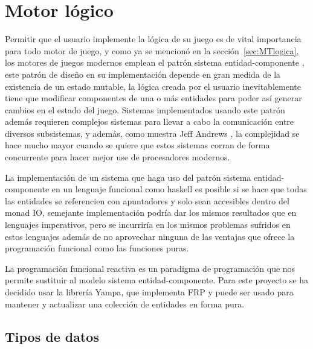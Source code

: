 
\section{Motor lógico}

Permitir que el usuario implemente la lógica de su juego es de vital importancia para todo motor de juego, y como ya se mencionó en la sección~\ref{sec:MTlogica}, los motores de juegos modernos emplean  el patrón sistema entidad-componente , este patrón de diseño en su implementación depende en gran medida de la existencia de un estado mutable, la lógica creada por el usuario inevitablemente tiene que modificar componentes de una o más entidades para poder así generar cambios en el estado del juego. Sistemas implementados usando este patrón además requieren complejos sistemas para llevar a cabo la comunicación entre diversos subsistemas, y además, como muestra Jeff Andrews \cite{andrews2009designing}, la complejidad se hace mucho mayor cuando se quiere que estos sistemas corran de forma concurrente para hacer mejor use de procesadores modernos.

La implementación de un sistema que haga uso del patrón sistema entidad-componente en un lenguaje funcional como haskell es posible si se hace que todas las entidades se referencien con apuntadores y solo sean accesibles dentro del monad IO, semejante implementación podría dar los mismos resultados que en lenguajes imperativos, pero se incurriría en los mismos problemas sufridos en estos lenguajes además de no aprovechar ninguna de las ventajas que ofrece la programación funcional como las funciones puras.

La programación funcional reactiva es un paradigma de programación que nos permite sustituir al modelo sistema entidad-componente. Para este proyecto se ha decidido usar la librería Yampa, que implementa FRP y puede ser usado para mantener y actualizar una colección de entidades en forma pura.

\subsection{Tipos de datos}

